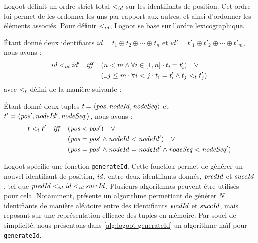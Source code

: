 Logoot définit un ordre strict total $<_{id}$ sur les identifiants de position.
Cet ordre lui permet de les ordonner les uns par rapport aux autres, et ainsi d'ordonner les éléments associés.
Pour définir $<_{id}$, Logoot se base sur l'ordre lexicographique.
\begin{definition}
  Étant donné deux identifiants $id = t_1 \oplus t_2 \oplus \cdots \oplus t_n$ et $id' = t'_1 \oplus t'_2 \oplus \cdots \oplus t'_m$, nous avons :
  \begin{equation*}
    \begin{split}
      id <_{id} id' \quad \mathit{iff} \quad     & (n < m \land \forall i \in [1,n] \cdot t_i = t'_i) \quad \lor \\
                                            & (\exists j \leq m \cdot \forall i < j \cdot t_i = t'_i \land t_j <_{t} t'_j) \\
    \end{split}
  \end{equation*}
  avec $<_{t}$ défini de la manière suivante :
  \begin{subdefinition}
    Étant donné deux tuples $t = \langle \mathit{pos},\mathit{nodeId},\mathit{nodeSeq} \rangle$ et $t' = \langle \mathit{pos'},\mathit{nodeId'},\mathit{nodeSeq'} \rangle$, nous avons :
    \begin{equation*}
      \begin{split}
        t <_{t} t' \quad \mathit{iff} \quad  & (\mathit{pos} < \mathit{pos}') \quad \lor \\
                                            & (\mathit{pos} = \mathit{pos'} \land \mathit{nodeId} < \mathit{nodeId'}) \quad \lor \\
                                            & (\mathit{pos} = \mathit{pos'} \land \mathit{nodeId} = \mathit{nodeId'} \land \mathit{nodeSeq} < \mathit{nodeSeq'}) \\
      \end{split}
    \end{equation*}
  \end{subdefinition}
\end{definition}

Logoot spécifie une fonction \texttt{generateId}.
Cette fonction permet de générer un nouvel identifiant de position, $\mathit{id}$, entre deux identifiants donnés, $\mathit{predId}$ et $\mathit{succId}$, tel que $\mathit{predId} <_{id} \mathit{id} <_{id} \mathit{succId}$.
Plusieurs algorithmes peuvent être utilisés pour cela.
Notamment, \cite{2009-logoot-weiss} présente un algorithme permettant de générer $N$ identifiants de manière aléatoire entre des identifiants $\mathit{predId}$ et $\mathit{succId}$, mais reposant sur une représentation efficace des tuples en mémoire.
Par souci de simplicité, nous présentons dans \autoref{alg:logoot-generateId} un algorithme naïf pour \texttt{generateId}.


